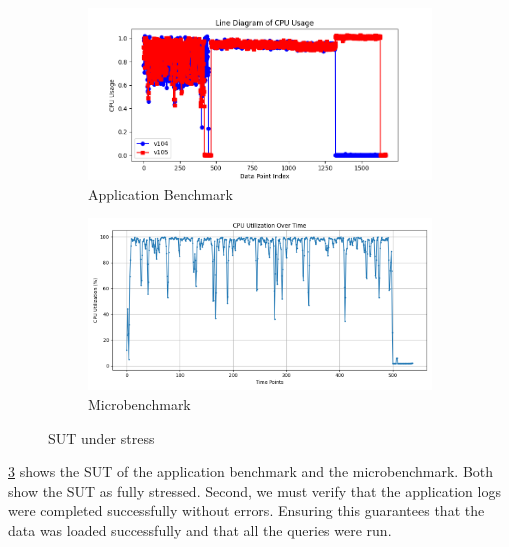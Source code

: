\begin{figure}[!htbp]
    \captionsetup[subfigure]{list=true}
     \centering
     \begin{subfigure}[b]{0.7\textwidth}
         \centering
         \includegraphics[width=\textwidth]{figures/applicationBenchmark_SUT.png}
         \caption{Application Benchmark}
         \label{fig:applicationBenchmark_SUT}
     \end{subfigure}
     \hfill
     \begin{subfigure}[b]{0.7\textwidth}
         \centering
         \includegraphics[width=\textwidth]{figures/cpu_utilization_analysis.png}
         \caption{Microbenchmark}
         \label{fig:microbenchmark_SUT}
     \end{subfigure}
     \caption{SUT under stress}
     \label{fig:SUT_under_streess}
\end{figure}

\cref{fig:SUT_under_streess} shows the \ac{SUT} of the application benchmark and the microbenchmark. Both show the \ac{SUT} as fully stressed. Second, we must verify that the application logs were completed successfully without errors. Ensuring this guarantees that the data was loaded successfully and that all the queries were run. 

